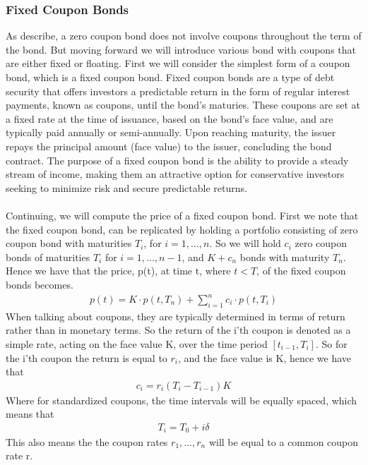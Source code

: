 \subsubsection{Fixed Coupon Bonds}
As describe, a zero coupon bond does not involve coupons throughout the term of the bond. 
But moving forward we will introduce various bond with coupons that are either fixed 
or floating. First we will consider the simplest form of a coupon bond, which is a 
fixed coupon bond. Fixed coupon bonds are a type of debt security that offers investors a predictable
return in the form of regular interest payments, known as coupons, until the bond's maturies.
These coupons are set at a fixed rate at the time of issuance, based on the bond's face value,
and are typically paid annually or semi-annually. Upon reaching maturity, the issuer repays 
the principal amount (face value) to the issuer, concluding the bond contract. The purpose
of a fixed coupon bond is the ability to provide a steady stream of income,
making them an attractive option for conservative investors seeking to minimize risk and 
secure predictable returns.
\\\\
Continuing, we will compute the price of a fixed coupon bond. First we note that the fixed coupon bond,
can be replicated by holding a portfolio consisting of zero coupon bond with maturities $T_i$, for 
$i=1,...,n$. So we will hold $c_i$ zero coupon bonds of maturities $T_i$ for $i=1,...,n-1$, and 
$K+c_n$ bonds with maturity $T_n$. Hence we have that the price, p(t), at time t, where $t<T$, of 
the fixed coupon bonds becomes. \cite{Bjork}
\begin{align*}
    p(t) = K \cdot p(t,T_n) + \sum_{i=1}^{n}c_i \cdot p(t,T_i)
\end{align*}
When talking about coupons, they are typically determined in terms of return rather than in monetary terms.
So the return of the i'th coupon is denoted as a simple rate, acting on the face value K, over the
time period $[t_{i-1},T_i]$. So for the i'th coupon the return is equal to $r_i$, and the face value 
is K, hence we have that 
\begin{align*}
    c_i = r_i(T_i-T_{i-1})K
\end{align*}
Where for standardized coupons, the time intervals will be equally spaced, which means that 
\begin{align*}
    T_i = T_0 + i \delta
\end{align*}
This also means the the coupon rates $r_1,...,r_n$ will be equal to a common coupon rate r. 
